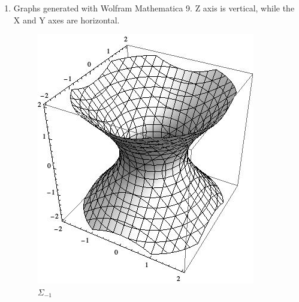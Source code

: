 \documentclass[letterpaper,10pt]{article}
\begin{document}
\begin{enumerate}
	\begin{enumerate}
		\item Graphs generated with Wolfram Mathematica 9. Z axis is vertical, while the X and Y axes are horizontal.
		\begin{figure}[ht]
			\begin{minipage}[b]{0.30\linewidth}
				\centering
				\includegraphics[width=\textwidth]{images/-1.jpeg}
				\caption{$\Sigma_{-1}$}
				\label{fig:figure1}
			\end{minipage}
			\hspace{0.3cm}
			\begin{minipage}[b]{0.30\linewidth}
				\centering

\end{minipage}
\end{figure}
\end{enumerate}
\end{enumerate}
\end{document}
